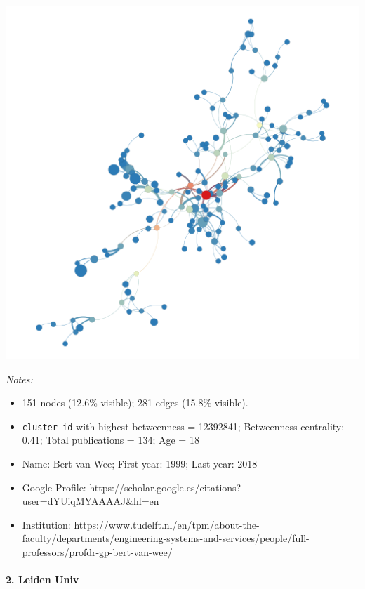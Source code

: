 \documentclass[]{elsarticle} %
\makeatletter
\providecommand{\tightlist}{%
  \setlength{\itemsep}{0pt}\setlength{\parskip}{0pt}}
\def\maxwidth{\ifdim\Gin@nat@width>\linewidth\linewidth
\else\Gin@nat@width\fi}
\let\Oldincludegraphics\includegraphics
\renewcommand{\includegraphics}[1]{\Oldincludegraphics[width=\maxwidth]{#1}}
\makeatother
\begin{document}
\includegraphics{figs/tu_soc_betweenness.png}

\emph{Notes:}

\begin{itemize}
\tightlist
\item
  151 nodes (12.6\% visible); 281 edges (15.8\% visible).
\item
  \texttt{cluster\_id} with highest betweenness = 12392841; Betweenness
  centrality: 0.41; Total publications = 134; Age = 18
\item
  Name: Bert van Wee; First year: 1999; Last year: 2018
\item
  Google Profile:
  https://scholar.google.es/citations?user=dYUiqMYAAAAJ\&hl=en
\item
  Institution:
  https://www.tudelft.nl/en/tpm/about-the-faculty/departments/engineering-systems-and-services/people/full-professors/profdr-gp-bert-van-wee/
\end{itemize}

\hypertarget{leiden-univ-2}{%
\paragraph{2. Leiden Univ}\label{leiden-univ-2}}
\end{document}
